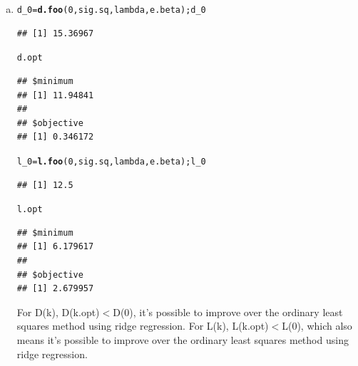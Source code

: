 \documentclass{article}\usepackage[]{graphicx}\usepackage[]{color}
\makeatletter
\newcommand{\hlnum}[1]{\textcolor[rgb]{0.686,0.059,0.569}{#1}}%
\newcommand{\hlstd}[1]{\textcolor[rgb]{0.345,0.345,0.345}{#1}}%
\newcommand{\hlkwb}[1]{\textcolor[rgb]{0.69,0.353,0.396}{#1}}%
\newcommand{\hlkwd}[1]{\textcolor[rgb]{0.737,0.353,0.396}{\textbf{#1}}}%
\newenvironment{kframe}{%
 \def\at@end@of@kframe{}%
 \ifinner\ifhmode%
  \def\at@end@of@kframe{\end{minipage}}%
  \begin{minipage}{\columnwidth}%
 \fi\fi%
 \def\FrameCommand##1{\hskip\@totalleftmargin \hskip-\fboxsep
 \colorbox{shadecolor}{##1}\hskip-\fboxsep
     \hskip-\linewidth \hskip-\@totalleftmargin \hskip\columnwidth}%
 \MakeFramed {\advance\hsize-\width
   \@totalleftmargin\z@ \linewidth\hsize
   \@setminipage}}%
 {\par\unskip\endMakeFramed%
 \at@end@of@kframe}
\newenvironment{knitrout}{}{} %
\makeatother
\begin{document}
\begin{enumerate}[(a)]
\item

\begin{knitrout}
\color{fgcolor}\begin{kframe}
\begin{alltt}
  \hlstd{d_0} \hlkwb{=} \hlkwd{d.foo}\hlstd{(}\hlnum{0}\hlstd{, sig.sq, lambda, e.beta); d_0}
\end{alltt}
\begin{verbatim}
## [1] 15.36967
\end{verbatim}
\begin{alltt}
  \hlstd{d.opt}
\end{alltt}
\begin{verbatim}
## $minimum
## [1] 11.94841
## 
## $objective
## [1] 0.346172
\end{verbatim}
\begin{alltt}
  \hlstd{l_0} \hlkwb{=} \hlkwd{l.foo}\hlstd{(}\hlnum{0}\hlstd{, sig.sq, lambda, e.beta); l_0}
\end{alltt}
\begin{verbatim}
## [1] 12.5
\end{verbatim}
\begin{alltt}
  \hlstd{l.opt}
\end{alltt}
\begin{verbatim}
## $minimum
## [1] 6.179617
## 
## $objective
## [1] 2.679957
\end{verbatim}
\end{kframe}
\end{knitrout}

\qquad For D(k), D(k.opt)$<$D(0), it's possible to improve over the ordinary least squares method using ridge regression.
For L(k), L(k.opt)$<$L(0), which also means it's possible to improve over the ordinary least squares method using ridge regression.



\end{enumerate}
\end{document}
